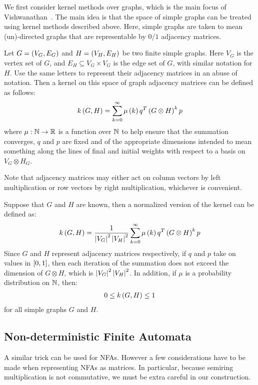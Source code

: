 \documentclass[12pt]{article}
\begin{document}
We first consider kernel methods over graphs, which is the main focus
of Vishwanathan~\cite{vishwanathan2010graph}.
The main idea is that the space of simple graphs can be treated
using kernel methods described above.
Here, simple graphs are taken to mean (un)-directed graphs
that are representable by \(0 / 1\) adjacency matrices.

Let \(G = \left(V_G, E_G\right)\) and
\(H = \left(V_H, E_H\right)\) be two finite simple graphs.
Here \(V_G\) is the vertex set of \(G\), and \(E_H \subseteq V_G \times V_G\)
is the edge set of \(G\), with similar notation for \(H\).
Use the same letters to represent their adjacency matrices in an abuse
of notation.
Then a kernel on this space of graph adjacency matrices can be
defined as follows:
\begin{align*}
  k\left(G, H\right)
    = \sum_{k = 0}^{\infty} \mu\left(k\right) q^T \left(G \otimes H\right)^k p
\end{align*}
where \(\mu : \mathbb{N} \to \mathbb{R}\) is a function over \(\mathbb{N}\)
to help ensure that the summation converges,
\(q\) and \(p\) are fixed and of the appropriate dimensions
intended to mean something along the lines of final
and initial weights with respect to a basis on \(V_G \otimes H_G\).

Note that adjacency matrices may either act on column vectors by
left multiplication or row vectors by right multiplication,
whichever is convenient.

Suppose that \(G\) and \(H\) are known,
then a normalized version of the kernel can be defined as:
\begin{align*}
  k\left(G, H\right)
    = \frac{1}{\left\lvert V_G\right\rvert^2 \left\lvert V_H\right\rvert^2}
      \sum_{k = 0}^{\infty} \mu\left(k\right) q^T \left(G \otimes H\right)^k p
\end{align*}
Since \(G\) and \(H\) represent adjacency matrices respectively,
if \(q\) and \(p\) take on values in \(\left[0, 1\right]\),
then each iteration of the summation does not exceed the dimension
of \(G \otimes H\),
which is \(\left\lvert V_G\right\rvert^2 \left\lvert V_H\right\rvert^2\).
In addition, if \(\mu\) is a probability distribution on \(\mathbb{N}\), then:
\begin{align*}
  0 \leq k\left(G, H\right) \leq 1
\end{align*}
for all simple graphs \(G\) and \(H\).





\subsection{Non-deterministic Finite Automata}
A similar trick can be used for NFAs.
However a few considerations have to be made when representing NFAs
as matrices.
In particular, because semiring multiplication is not commutative,
we must be extra careful in our construction.
\end{document}
